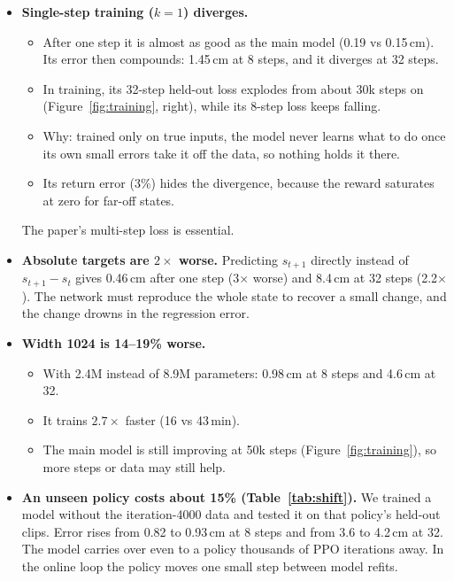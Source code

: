 \documentclass[10pt]{article}
\newcommand{\fig}[1]{Figure~\ref{#1}}
\newcommand{\tab}[1]{Table~\ref{#1}}
\begin{document}
\begin{itemize}
  \item \textbf{Single-step training ($k{=}1$) diverges.}
  \begin{itemize}
    \item After one step it is almost as good as the main model (0.19 vs 0.15\,cm). Its error then
    compounds: 1.45\,cm at 8 steps, and it diverges at 32 steps.
    \item In training, its 32-step held-out loss explodes from about 30k steps on (\fig{fig:training},
    right), while its 8-step loss keeps falling.
    \item Why: trained only on true inputs, the model never learns what to do once its own small errors
    take it off the data, so nothing holds it there.
    \item Its return error (3\%) hides the divergence, because the reward saturates at zero for
    far-off states.
  \end{itemize}
  The paper's multi-step loss is essential.
  \item \textbf{Absolute targets are $2\times$ worse.} Predicting $s_{t+1}$ directly instead of
  $s_{t+1} - s_t$ gives 0.46\,cm after one step (3$\times$ worse) and 8.4\,cm at 32 steps
  (2.2$\times$). The network must reproduce the whole state to recover a small change, and the change
  drowns in the regression error.
  \item \textbf{Width 1024 is 14--19\% worse.}
  \begin{itemize}
    \item With 2.4M instead of 8.9M parameters: 0.98\,cm at 8 steps and 4.6\,cm at 32.
    \item It trains $2.7\times$ faster (16 vs 43\,min).
    \item The main model is still improving at 50k steps (\fig{fig:training}), so more steps or data
    may still help.
  \end{itemize}
  \item \textbf{An unseen policy costs about 15\% (\tab{tab:shift}).} We trained a model without the
  iteration-4000 data and tested it on that policy's held-out clips. Error rises from 0.82 to 0.93\,cm at
  8 steps and from 3.6 to 4.2\,cm at 32. The model carries over even to a policy thousands of PPO
  iterations away. In the online loop the policy moves one small step between model refits.
\end{itemize}

\begin{table}[H]
\centering\small
\caption{Policy shift: held-out clips of the iteration-4000 data, for the main model (trained on it)
and a model trained only on the iteration-1000 and 8800 data.}
\label{tab:shift}

\end{table}
\end{document}

